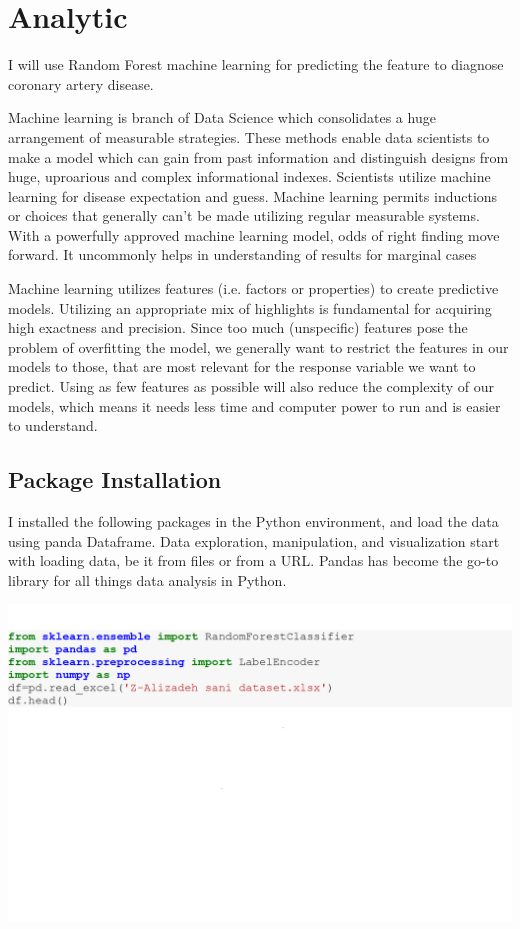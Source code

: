 \documentclass[sigconf]{acmart}
\begin{document}
\section{Analytic}
I will use Random Forest machine learning for predicting the feature to diagnose coronary artery disease.

Machine learning is branch of Data Science which consolidates a huge arrangement of measurable strategies. These methods enable data scientists to make a model which can gain from past information and distinguish designs from huge, uproarious and complex informational indexes. Scientists utilize machine learning for disease expectation and guess. Machine learning permits inductions or choices that generally can't be made utilizing regular measurable systems. With a powerfully approved machine learning model, odds of right finding move forward. It uncommonly helps in understanding of results for marginal cases

Machine learning utilizes features (i.e. factors or properties) to create predictive models. Utilizing an appropriate mix of highlights is fundamental for acquiring high exactness and precision. Since too much (unspecific) features pose the problem of overfitting the model, we generally want to restrict the features in our models to those, that are most relevant for the response variable we want to predict. Using as few features as possible will also reduce the complexity of our models, which means it needs less time and computer power to run and is easier to understand.

\subsection{Package Installation}

I installed the following packages in the Python environment, and load the data using panda Dataframe. Data exploration, manipulation, and visualization start with loading data, be it from files or from a URL. Pandas has become the go-to library for all things data analysis in Python.

\includegraphics[width=0.95\columnwidth]{images/Untitled1.png}
\end{document}
